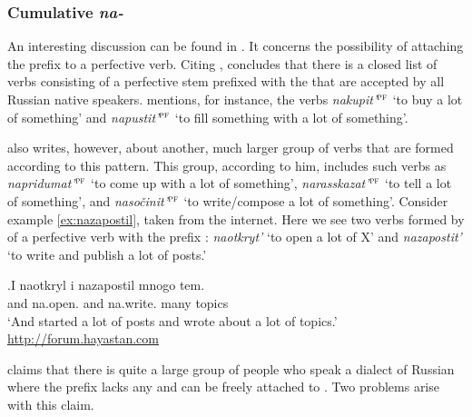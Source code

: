 \subsubsection{Cumulative \textit{na-}}
An interesting discussion can be found in \citet{Tatevosov:13a}. It concerns the possibility of attaching the  prefix  to a perfective verb. Citing \citet{Zaliznjak:03}, \citet{Tatevosov:13a} concludes that there is a closed list of verbs consisting of a perfective stem prefixed with the   that are accepted by all Russian native speakers. \citet{Tatevosov:13a} mentions, for instance, the verbs \textit{nakupit'}$^{\textsc{pf}}$ `to buy a lot of something' and \textit{napustit'}$^{\textsc{pf}}$ `to fill something with a lot of something'. 

\citeauthor{Tatevosov:13a} also writes, however, about another, much larger group of verbs that are formed according to this pattern. This group, according to him, includes such verbs as \textit{napridumat'}$^{\textsc{pf}}$ `to come up with a lot of something', \textit{narasskazat'}$^{\textsc{pf}}$ `to tell a lot of something', and \textit{naso\v{c}init'}$^{\textsc{pf}}$ `to write/compose a lot of something'. Consider example \ref{ex:nazapostil}, taken from the internet. Here we see two verbs formed by  of a perfective verb with the  prefix : \textit{naotkryt'} `to open a lot of X' and \textit{nazapostit'} `to write and publish a lot of posts.'
 
\exg.\label{ex:nazapostil}I naotkryl i nazapostil mnogo tem.\\
and na.open. and {na.write.} {many} {topics}\\
\trans `And started a lot of posts and wrote about a lot of topics.'\\\hbox{}\hfill\hbox{\url{http://forum.hayastan.com}}

\citet{Tatevosov:13a} claims that there is quite a large group of people who speak a dialect of Russian where the  prefix  lacks any  and can be freely attached to . Two problems arise with this claim.


